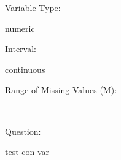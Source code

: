 \documentclass[
]{article}
\begin{document}
\newpage

\begin{minipage}[t]{0.3\linewidth}

\colorbox{mypink1}{}

\end{minipage}%
\begin{minipage}[t]{0.7\linewidth}

\colorbox{mypink1}{}

\end{minipage}

\begin{minipage}[t]{0.3\linewidth}

Variable Type:

\end{minipage}%
\begin{minipage}[t]{0.7\linewidth}

numeric

\end{minipage}

\begin{minipage}[t]{0.3\linewidth}

Interval:

\end{minipage}%
\begin{minipage}[t]{0.7\linewidth}

continuous

\end{minipage}

\begin{minipage}[t]{0.3\linewidth}

Range of Missing Values (M):

\end{minipage}%
\begin{minipage}[t]{0.7\linewidth}

~

\end{minipage}

\begin{minipage}[t]{0.3\linewidth}

Question:

\end{minipage}%
\begin{minipage}[t]{0.7\linewidth}

test con var

\end{minipage}
\end{document}
